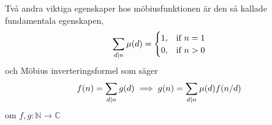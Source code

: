 Två andra viktiga egenskaper hos möbiusfunktionen är den så kallade fundamentala egenskapen,
\begin{equation*}
    \sum_{d \mid n} \mu(d) =
    \begin{cases}
        1, & \text{if}\ n = 1 \\
        0, & \text{if}\ n > 0
    \end{cases}
\end{equation*}
och Möbius inverteringsformel som säger
\begin{equation*}
    f(n) = \sum_{d \mid n} g(d) \implies g(n) = \sum_{d \mid n} \mu(d) f(n/d)
\end{equation*}
om \(f, g : \mathbb{N} \to \mathbb{C}\)


